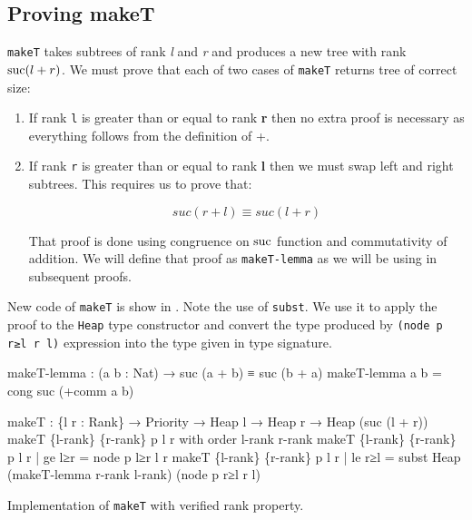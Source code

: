 \subsection{Proving makeT}\label{sec:twopass-makeT-proof}

\texttt{makeT} takes subtrees of rank \textit{l} and \textit{r} and produces a new tree with rank $\operatorname{suc}(l + r)$. We must prove that each of two cases of \texttt{makeT} returns tree of correct size:

\begin{enumerate}
 \item If rank \texttt{l} is greater than or equal to rank \textbf{r} then no extra proof is necessary as everything follows from the definition of +.
 \item If rank \texttt{r} is greater than or equal to rank \textbf{l} then we must swap left and right subtrees. This requires us to prove that:

\begin{equation*}
suc (r + l) ≡ suc (l + r)
\end{equation*}

That proof is done using congruence on $\operatorname{suc}$ function and commutativity of addition. We will define that proof as \texttt{makeT-lemma} as we will be using in subsequent proofs.
\end{enumerate}
\noindent
New code of \texttt{makeT} is show in . Note the use of \texttt{subst}. We use it to apply the proof to the \texttt{Heap} type constructor and convert the type produced by \texttt{(node p r≥l r l)} expression into the type given in type signature. %

\begin{listing}[thb!]
\begin{code}
makeT-lemma : (a b : Nat) → suc (a + b) ≡ suc (b + a)
makeT-lemma a b = cong suc (+comm a b)

makeT : \{l r : Rank\} → Priority → Heap l → Heap r → Heap (suc (l + r))
makeT \{l-rank\} \{r-rank\} p l r with order l-rank r-rank
makeT \{l-rank\} \{r-rank\} p l r | ge l≥r
  = node p l≥r l r
makeT \{l-rank\} \{r-rank\} p l r | le r≥l
  = subst Heap (makeT-lemma r-rank l-rank) (node p r≥l r l)
\end{code}
\caption{Implementation of \texttt{makeT} with verified rank property.}\label{lst:rank-proof-makeT-two-pass}
\end{listing}


